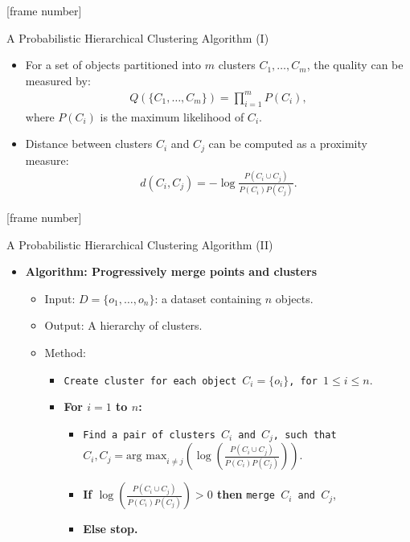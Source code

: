 \documentclass[aspectratio=169,t,xcolor=dvipsnames]{beamer}
\begin{document}
  {
    [frame number]
    \begin{frame}{A Probabilistic Hierarchical Clustering Algorithm (I)}
      \centering
      \begin{itemize}
        \item For a set of objects partitioned into $m$ clusters $C_1, \ldots, C_m$,
              the quality can be measured by:
              \begin{align}
                Q(\{C_1, \ldots, C_m\}) = \prod_{i=1}^{m} P(C_i),
              \end{align}
              where $P(C_i)$ is the maximum likelihood of $C_i$.
        \item Distance between clusters $C_i$ and $C_j$ can be computed as a proximity measure:
              \begin{align}
                d(C_i,C_j) = - \log \frac{P(C_i \cup C_j)}{P(C_i)P(C_j)}.
              \end{align}
      \end{itemize}
    \end{frame}
  }

  {
    [frame number]
    \begin{frame}{A Probabilistic Hierarchical Clustering Algorithm (II)}
      \centering
      \begin{itemize}
        \item \textbf{Algorithm: Progressively merge points and clusters}
        \begin{itemize}
          \item Input: $D = \{o_1, \ldots, o_n\}$: a dataset containing $n$ objects.
          \item Output: A hierarchy of clusters.
          \item Method:
          \begin{itemize}
            \item \texttt{Create cluster for each object $C_i = \{o_i\}$, for $1 \leq i \leq n$}.
            \item \textbf{For $i=1$ to $n$:}
            \begin{itemize}
              \item \texttt{Find a pair of clusters $C_i$ and $C_j$, such that}\\
                    $C_i, C_j = \text{arg max}_{i \neq j} \left( \log\left( \frac{P(C_i \cup C_j)}{P(C_i)P(C_j)} \right) \right)$.
                    \item \textbf{If $\log\left( \frac{P(C_i \cup C_j)}{P(C_i)P(C_j)}\right) > 0$ then} \texttt{merge $C_i$ and $C_j$},
                    \item \textbf{Else stop.}
            \end{itemize}
          \end{itemize}
        \end{itemize}
      \end{itemize}
    \end{frame}
  }
\end{document}
